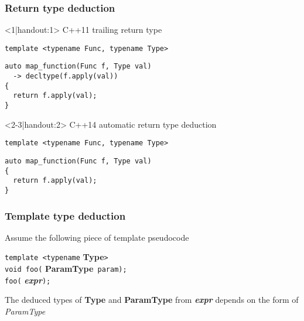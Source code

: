 \documentclass[14pt,a4paper,dvipsnames,usenames]{beamer}
\begin{document}
\begin{frame}[fragile]
  \frametitle{Return type deduction}

  \begin{onlyenv}<1|handout:1>
  C++11 trailing return type

  \vspace{.5cm}
  \begin{lstlisting}
template <typename Func, typename Type>
  \end{lstlisting}
  \vspace*{-.4cm}
  \begin{lstlisting}[morekeywords={Func,Type,decltype},deletekeywords={map}]
auto map_function(Func f, Type val)
  -> decltype(f.apply(val))
{
  return f.apply(val);
}
  \end{lstlisting}
  \end{onlyenv}

  \begin{onlyenv}<2-3|handout:2>
  C++14 automatic return type deduction

  \vspace{.5cm}
  \begin{lstlisting}
template <typename Func, typename Type>
  \end{lstlisting}
  \vspace*{-.4cm}
  \begin{lstlisting}[morekeywords={Func,Type,decltype},deletekeywords={map}]
auto map_function(Func f, Type val)
{
  return f.apply(val);
}
  \end{lstlisting}

  \vspace{.5cm}
  \end{onlyenv}

\end{frame}

\begin{frame}[fragile]
  \frametitle{Template type deduction}

  Assume the following piece of template pseudocode

  \vspace{1cm}
  \lstinline!template <typename! {\ttfamily\bfseries\color{Marty}Type}\lstinline!>!\\
  \lstinline!void foo(! {\ttfamily\bfseries\color{Marty}ParamType}\lstinline! param);!\\[10pt]
  \lstinline!foo(! {\ttfamily\bfseries\itshape\color{Marty}expr}\lstinline!);!

  \vspace{1cm}
  The deduced types of {\ttfamily\bfseries\color{Marty}Type} and {\ttfamily\bfseries\color{Marty}ParamType} from
  {\ttfamily\bfseries\itshape\color{Marty}expr} depends on the form of {\itshape{}ParamType}
  
\end{frame}
\end{document}
